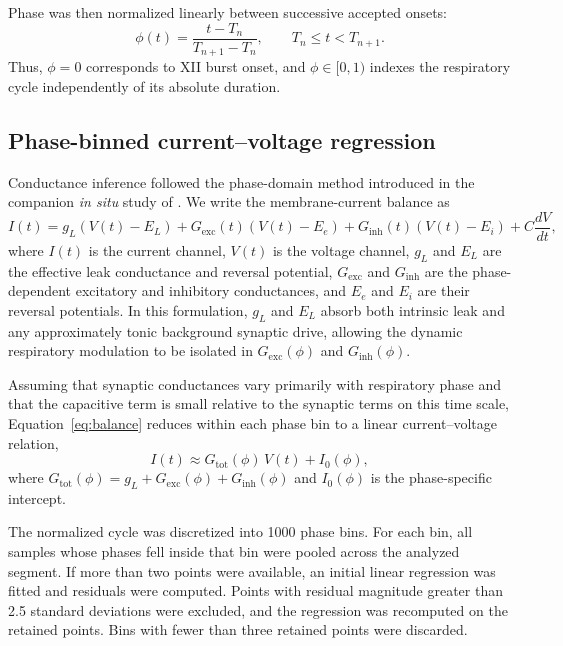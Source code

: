 \documentclass[11pt]{article}
\begin{document}
Phase was then normalized linearly between successive accepted onsets:
\begin{equation}
\phi(t) = \frac{t - T_n}{T_{n+1} - T_n}, \qquad T_n \le t < T_{n+1}.
\end{equation}
Thus, $\phi=0$ corresponds to XII burst onset, and $\phi \in [0,1)$ indexes the respiratory cycle independently of its absolute duration.

\subsection{Phase-binned current--voltage regression}
Conductance inference followed the phase-domain method introduced in the companion \textit{in situ} study of \citet{molkov2024inference}. We write the membrane-current balance as
\begin{equation}
I(t) = g_L\!\left(V(t)-E_L\right) + G_{\mathrm{exc}}(t)\!\left(V(t)-E_e\right) + G_{\mathrm{inh}}(t)\!\left(V(t)-E_i\right) + C\frac{dV}{dt},
\label{eq:balance}
\end{equation}
where $I(t)$ is the current channel, $V(t)$ is the voltage channel, $g_L$ and $E_L$ are the effective leak conductance and reversal potential, $G_{\mathrm{exc}}$ and $G_{\mathrm{inh}}$ are the phase-dependent excitatory and inhibitory conductances, and $E_e$ and $E_i$ are their reversal potentials. In this formulation, $g_L$ and $E_L$ absorb both intrinsic leak and any approximately tonic background synaptic drive, allowing the dynamic respiratory modulation to be isolated in $G_{\mathrm{exc}}(\phi)$ and $G_{\mathrm{inh}}(\phi)$.

Assuming that synaptic conductances vary primarily with respiratory phase and that the capacitive term is small relative to the synaptic terms on this time scale, Equation~\ref{eq:balance} reduces within each phase bin to a linear current--voltage relation,
\begin{equation}
I(t) \approx G_{\mathrm{tot}}(\phi)\,V(t) + I_0(\phi),
\end{equation}
where $G_{\mathrm{tot}}(\phi)=g_L+G_{\mathrm{exc}}(\phi)+G_{\mathrm{inh}}(\phi)$ and $I_0(\phi)$ is the phase-specific intercept.

The normalized cycle was discretized into 1000 phase bins. For each bin, all samples whose phases fell inside that bin were pooled across the analyzed segment. If more than two points were available, an initial linear regression was fitted and residuals were computed. Points with residual magnitude greater than 2.5 standard deviations were excluded, and the regression was recomputed on the retained points. Bins with fewer than three retained points were discarded.
\end{document}
